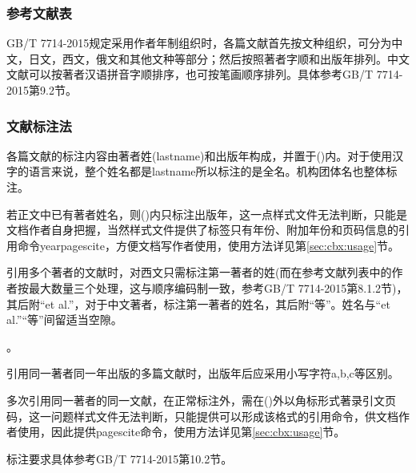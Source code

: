 \subsubsection{参考文献表}

GB/T 7714-2015规定采用作者年制组织时，各篇文献首先按文种组织，可分为中文，日文，西文，俄文和其他文种等部分；然后按照著者字顺和出版年排列。中文文献可以按著者汉语拼音字顺排序，也可按笔画顺序排列。具体参考GB/T 7714-2015第9.2节。


\subsubsection{文献标注法}
各篇文献的标注内容由著者姓(lastname)和出版年构成，并置于()内。对于使用汉字的语言来说，整个姓名都是lastname所以标注的是全名。机构团体名也整体标注。

若正文中已有著者姓名，则()内只标注出版年，这一点样式文件无法判断，只能是文档作者自身把握，当然样式文件提供了标签只有年份、附加年份和页码信息的引用命令yearpagescite，方便文档写作者使用，使用方法详见第\ref{sec:cbx:usage}节。

引用多个著者的文献时，对西文只需标注第一著者的姓(而在参考文献列表中的作者按最大数量三个处理，这与顺序编码制一致，参考GB/T 7714-2015第8.1.2节)，其后附“et al.”，对于中文著者，标注第一著者的姓名，其后附“等”。姓名与“et al.”“等”间留适当空隙。

。

引用同一著者同一年出版的多篇文献时，出版年后应采用小写字符a,b,c等区别。

多次引用同一著者的同一文献，在正常标注外，需在()外以角标形式著录引文页码，这一问题样式文件无法判断，只能提供可以形成该格式的引用命令，供文档作者使用，因此提供pagescite命令，使用方法详见第\ref{sec:cbx:usage}节。

标注要求具体参考GB/T 7714-2015第10.2节。



